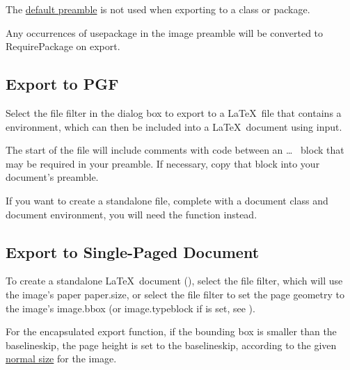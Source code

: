 \begin{important}
The \hyperref[sec:texconfigpreamble]{default preamble} is not used
when exporting to a class or package.
\end{important}

Any occurrences of \gls{usepackage} in the image
preamble will be converted to \gls{RequirePackage} on export.


\subsection{Export to PGF}\label{sec:exportpgf}

Select the  file filter in the 
dialog box to export to a \LaTeX\ file that contains a
 environment, which can then be included into a
\LaTeX\ document using \gls{input}.

The start of the file will include comments with
code between an  \ldots\  block
that may be required in your preamble. If necessary, copy that block
into your document's preamble.

If you want to create a standalone file, complete with a document
class and document environment, you will need the
 function instead.


\subsection{Export to Single-Paged Document}\label{sec:exportdoc}

To create a standalone \LaTeX\ document (), select
the  file filter, which will use the image's
paper \gls{paper.size}, or select the  file filter to
set the page geometry to the image's \gls{image.bbox} (or \gls{image.typeblock}
if  is set, see
).

\begin{information}
For the encapsulated export function,
if the bounding box is smaller than the baselineskip, the page
height is set to the baselineskip, according to the given
\hyperref[sec:normalsize]{normal size} for the image.
\end{information}


